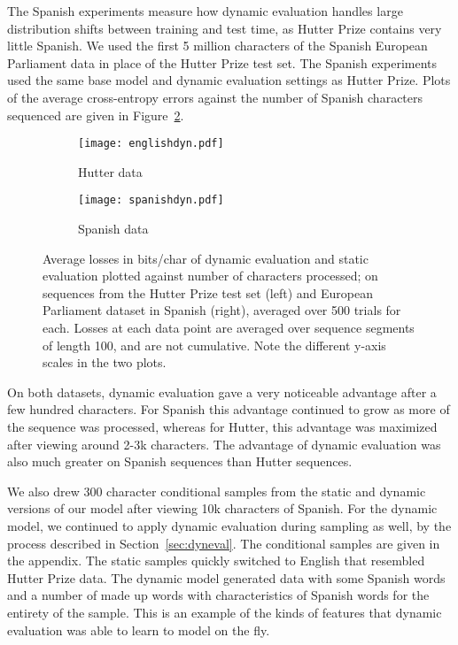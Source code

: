 \documentclass{article} \usepackage{iclr2018_conference,times}
\begin{document}
The Spanish experiments measure how dynamic evaluation handles large distribution shifts between training and test time, as Hutter Prize contains very little Spanish. We used the first 5 million characters of the Spanish European Parliament data in place of the Hutter Prize test set. The Spanish experiments used the same base model and dynamic evaluation settings as Hutter Prize.  Plots of the average cross-entropy errors against the number of Spanish characters sequenced are given in Figure~\ref{fig:spanish}.


\begin{figure}[!tb]
	\centering
	\begin{subfigure}{.4\textwidth}
		\centering
		\texttt{[image: englishdyn.pdf]}
		\caption{Hutter data}
		\label{fig:english}
	\end{subfigure}\begin{subfigure}{.4\textwidth}
		\centering
		\texttt{[image: spanishdyn.pdf]}
		\caption{Spanish data}
		\label{fig:spanish}
	\end{subfigure}
	\caption{Average losses in bits/char of dynamic evaluation and static evaluation plotted against number of characters processed; on sequences from the Hutter Prize test set (left) and European Parliament dataset in Spanish (right), averaged over 500 trials for each. Losses at each data point are averaged over sequence segments of length 100, and are not cumulative. Note the different y-axis scales in the two plots.}
	\label{fig:results}
\end{figure}



On both datasets, dynamic evaluation gave a very noticeable advantage after a few hundred characters. For Spanish this advantage continued to grow as more of the sequence was processed, whereas for Hutter, this advantage was maximized after viewing around 2-3k characters. The advantage of dynamic evaluation was also much greater on Spanish sequences than Hutter sequences. 

We also drew 300 character conditional samples from the static and dynamic versions of our model after viewing 10k characters of Spanish. For the dynamic model, we continued to apply dynamic evaluation during sampling as well, by the process described in Section~\ref{sec:dyneval}. The conditional samples are given in the appendix. The static samples quickly switched to English that resembled Hutter Prize data. The dynamic model generated data with some Spanish words and a number of made up words with characteristics of Spanish words for the entirety of the sample. This is an example of the kinds of features that dynamic evaluation was able to learn to model on the fly.
\end{document}
